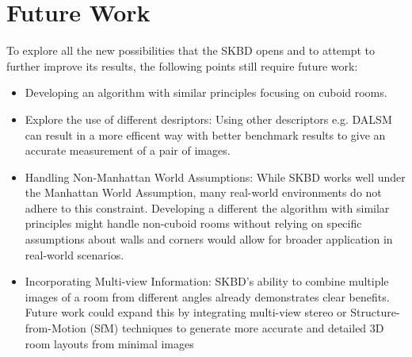 \section{Future Work}

To explore all the new possibilities that the SKBD opens and to attempt to further improve its results, the following points still require future work:
\begin{itemize}
  \item Developing an algorithm with similar principles focusing on cuboid rooms.
  \item Explore the use of different desriptors: Using other descriptors e.g. DALSM can result in a more efficent way with better benchmark results to give an accurate measurement of a pair of images.
  \item {Handling Non-Manhattan World Assumptions:} While SKBD works well under the Manhattan World Assumption, many real-world environments do not adhere to this constraint. Developing a different the algorithm with similar principles might handle non-cuboid rooms without relying on specific assumptions about walls and corners would allow for broader application in real-world scenarios.
  \item Incorporating Multi-view Information: SKBD's ability to combine multiple images of a room from different angles already demonstrates clear benefits. Future work could expand this by integrating multi-view stereo or Structure-from-Motion (SfM) techniques to generate more accurate and detailed 3D room layouts from minimal images
\end{itemize}
